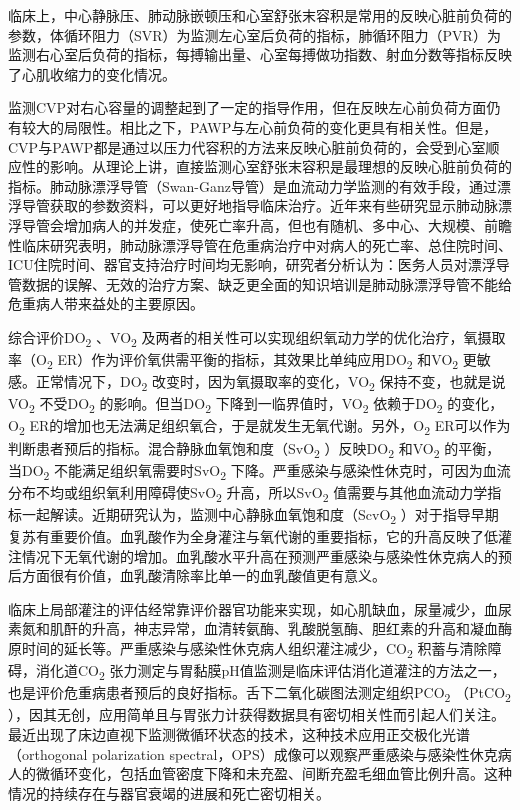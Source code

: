 临床上，中心静脉压、肺动脉嵌顿压和心室舒张末容积是常用的反映心脏前负荷的参数，体循环阻力（SVR）为监测左心室后负荷的指标，肺循环阻力（PVR）为监测右心室后负荷的指标，每搏输出量、心室每搏做功指数、射血分数等指标反映了心肌收缩力的变化情况。

监测CVP对右心容量的调整起到了一定的指导作用，但在反映左心前负荷方面仍有较大的局限性。相比之下，PAWP与左心前负荷的变化更具有相关性。但是，CVP与PAWP都是通过以压力代容积的方法来反映心脏前负荷的，会受到心室顺应性的影响。从理论上讲，直接监测心室舒张末容积是最理想的反映心脏前负荷的指标。肺动脉漂浮导管（Swan-Ganz导管）是血流动力学监测的有效手段，通过漂浮导管获取的参数资料，可以更好地指导临床治疗。近年来有些研究显示肺动脉漂浮导管会增加病人的并发症，使死亡率升高，但也有随机、多中心、大规模、前瞻性临床研究表明，肺动脉漂浮导管在危重病治疗中对病人的死亡率、总住院时间、ICU住院时间、器官支持治疗时间均无影响，研究者分析认为：医务人员对漂浮导管数据的误解、无效的治疗方案、缺乏更全面的知识培训是肺动脉漂浮导管不能给危重病人带来益处的主要原因。

综合评价DO\textsubscript{2} 、VO\textsubscript{2}
及两者的相关性可以实现组织氧动力学的优化治疗，氧摄取率（O\textsubscript{2}
ER）作为评价氧供需平衡的指标，其效果比单纯应用DO\textsubscript{2}
和VO\textsubscript{2} 更敏感。正常情况下，DO\textsubscript{2}
改变时，因为氧摄取率的变化，VO\textsubscript{2}
保持不变，也就是说VO\textsubscript{2} 不受DO\textsubscript{2}
的影响。但当DO\textsubscript{2} 下降到一临界值时，VO\textsubscript{2}
依赖于DO\textsubscript{2} 的变化，O\textsubscript{2}
ER的增加也无法满足组织氧合，于是就发生无氧代谢。另外，O\textsubscript{2}
ER可以作为判断患者预后的指标。混合静脉血氧饱和度（SvO\textsubscript{2}
）反映DO\textsubscript{2} 和VO\textsubscript{2}
的平衡，当DO\textsubscript{2} 不能满足组织氧需要时SvO\textsubscript{2}
下降。严重感染与感染性休克时，可因为血流分布不均或组织氧利用障碍使SvO\textsubscript{2}
升高，所以SvO\textsubscript{2}
值需要与其他血流动力学指标一起解读。近期研究认为，监测中心静脉血氧饱和度（ScvO\textsubscript{2}
）对于指导早期复苏有重要价值。血乳酸作为全身灌注与氧代谢的重要指标，它的升高反映了低灌注情况下无氧代谢的增加。血乳酸水平升高在预测严重感染与感染性休克病人的预后方面很有价值，血乳酸清除率比单一的血乳酸值更有意义。

临床上局部灌注的评估经常靠评价器官功能来实现，如心肌缺血，尿量减少，血尿素氮和肌酐的升高，神志异常，血清转氨酶、乳酸脱氢酶、胆红素的升高和凝血酶原时间的延长等。严重感染与感染性休克病人组织灌注减少，CO\textsubscript{2}
积蓄与清除障碍，消化道CO\textsubscript{2}
张力测定与胃黏膜pH值监测是临床评估消化道灌注的方法之一，也是评价危重病患者预后的良好指标。舌下二氧化碳图法测定组织PCO\textsubscript{2}
（PtCO\textsubscript{2}
），因其无创，应用简单且与胃张力计获得数据具有密切相关性而引起人们关注。最近出现了床边直视下监测微循环状态的技术，这种技术应用正交极化光谱（orthogonal
polarization
spectral，OPS）成像可以观察严重感染与感染性休克病人的微循环变化，包括血管密度下降和未充盈、间断充盈毛细血管比例升高。这种情况的持续存在与器官衰竭的进展和死亡密切相关。

